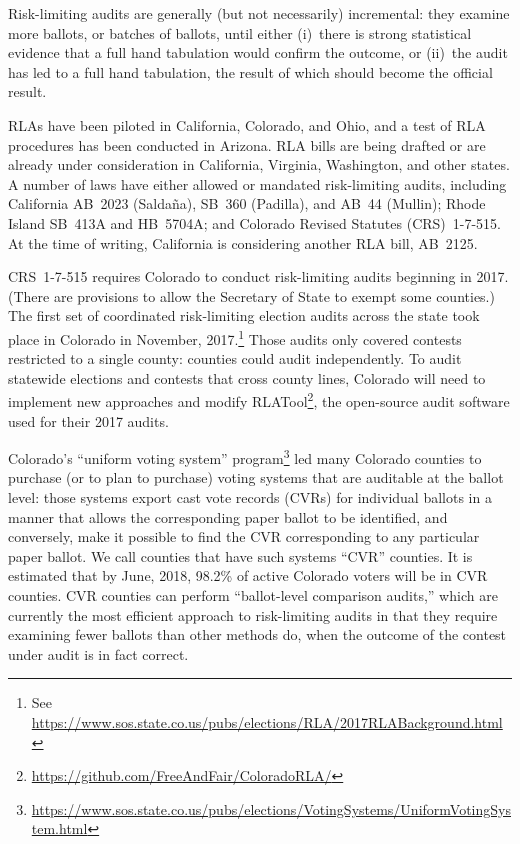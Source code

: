 \documentclass[runningheads]{llncs}
\begin{document}
Risk-limiting audits are generally (but not necessarily) incremental: they examine more ballots, or batches of ballots,
until either (i)~there is strong statistical evidence that a full hand tabulation would confirm the outcome,
or (ii)~the audit has led to a full hand tabulation, the result of which should become the official
result.

RLAs have been piloted in California, Colorado, and Ohio, and a test of
RLA procedures has been conducted in Arizona.
RLA bills are being drafted or are already under consideration in California,
Virginia, Washington, and other states.
A number of laws have either allowed or mandated risk-limiting audits,
including California AB~2023 (Salda\~{n}a), SB~360 (Padilla), and AB~44 (Mullin);
Rhode Island SB~413A and HB~5704A; and Colorado Revised Statutes (CRS)~1-7-515.
At the time of writing, California is considering another RLA bill, AB~2125.

CRS~1-7-515 requires 
Colorado to conduct risk-limiting audits beginning in 2017.
(There are provisions to allow the Secretary of State to exempt some counties.)
The first set of coordinated risk-limiting election audits across the state took place in Colorado in November, 2017.\footnote{%
 See \url{https://www.sos.state.co.us/pubs/elections/RLA/2017RLABackground.html}
}
Those audits only covered contests restricted to a single county:
counties could audit independently.
To audit statewide elections and contests that cross county lines, Colorado will need to implement new approaches
and modify RLATool\footnote{%
  \url{https://github.com/FreeAndFair/ColoradoRLA/}
}, 
the open-source audit software used for their 2017 audits. 

Colorado's ``uniform voting system'' program\footnote{%
  \url{https://www.sos.state.co.us/pubs/elections/VotingSystems/UniformVotingSystem.html}
} 
led many Colorado counties to purchase (or to plan to purchase) voting systems
that are auditable at the ballot level: those systems export cast vote records (CVRs)
for individual ballots in a manner that allows the corresponding paper ballot to be identified,
and conversely, make it possible to find the CVR corresponding to any
particular paper ballot.
We call counties that have such systems ``CVR'' counties.
It is estimated that by June, 2018, 98.2\% of active Colorado voters will be in CVR counties.
CVR counties can perform ``ballot-level comparison audits,'' \cite{lindemanStark12} 
which are currently the
most efficient approach to risk-limiting audits in that they require examining fewer
ballots than other methods do, when the outcome of the contest under audit 
is in fact correct.
\end{document}
